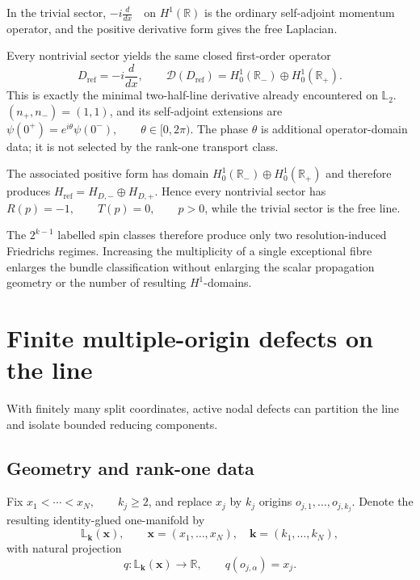 \documentclass[11pt]{article}
\theoremstyle{plain}
\theoremstyle{definition}
\begin{document}
In the trivial sector, \(-i\frac{d}{dx} \quad\text{on }H^1(\mathbb R)\) is the ordinary self-adjoint momentum operator, and the positive derivative
form gives the free Laplacian.

Every nontrivial sector yields the same closed first-order operator
\[
  D_{\mathrm{ref}}
  =
  -i\frac{d}{dx},
  \qquad
  \mathcal D(D_{\mathrm{ref}})
  =
  H^1_0(\mathbb R_-)
  \oplus
  H^1_0(\mathbb R_+).
\]
This is exactly the minimal two-half-line derivative already encountered on
\(\mathbb L_2\). \((n_+,n_-)=(1,1)\),
and its self-adjoint extensions are
\(\psi(0^+)=e^{i\theta}\psi(0^-), \qquad \theta\in[0,2\pi)\).
The phase \(\theta\) is additional operator-domain data; it is not selected
by the rank-one transport class.

The associated positive form has domain \(H^1_0(\mathbb R_-) \oplus H^1_0(\mathbb R_+)\) and therefore produces
\(H_{\mathrm{ref}} = H_{D,-}\oplus H_{D,+}\).
Hence every nontrivial sector has
\(R(p)=-1, \qquad T(p)=0, \qquad p>0\),
while the trivial sector is the free line.

The \(2^{k-1}\) labelled spin classes therefore produce only two
resolution-induced Friedrichs regimes. Increasing the multiplicity of a
single exceptional fibre enlarges the bundle classification without
enlarging the scalar propagation geometry or the number of resulting
\(H^1\)-domains.

\section{Finite multiple-origin defects on the line}
\label{sec:multisplit-line}

With finitely many split coordinates, active nodal defects can partition the line and isolate bounded reducing components.

\subsection{Geometry and rank-one data}
\label{subsec:multisplit-definition}
\label{subsec:multisplit-spin-classification}

Fix
\(x_1<\cdots<x_N, \qquad k_j\geq2\),
and replace \(x_j\) by \(k_j\) origins
\(o_{j,1},\ldots,o_{j,k_j}\).
Denote the resulting identity-glued one-manifold by
\[
  \mathbb L_{\mathbf k}(\mathbf x),
  \qquad
  \mathbf x=(x_1,\ldots,x_N),
  \quad
  \mathbf k=(k_1,\ldots,k_N),
\]
with natural projection
\[
  q:
  \mathbb L_{\mathbf k}(\mathbf x)
  \longrightarrow
  \mathbb R,
  \qquad
  q(o_{j,\alpha})=x_j.
\]
\end{document}
